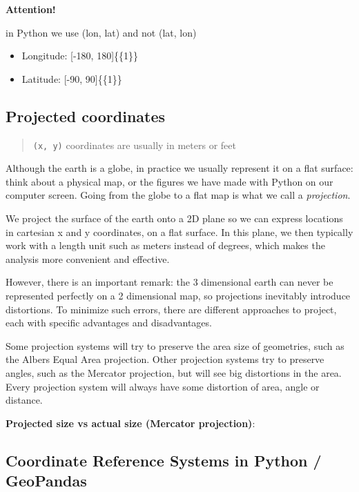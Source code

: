 \documentclass[
  letterpaper,
  DIV=11,
  numbers=noendperiod]{scrreprt}
\providecommand{\tightlist}{%
  \setlength{\itemsep}{0pt}\setlength{\parskip}{0pt}}\usepackage{longtable,booktabs,array}
\begin{document}
\textbf{Attention!}

in Python we use (lon, lat) and not (lat, lon)

\begin{itemize}
\tightlist
\item
  Longitude: {[}-180, 180{]}\{\{1\}\}
\item
  Latitude: {[}-90, 90{]}\{\{1\}\}
\end{itemize}

\subsection{Projected coordinates}\label{projected-coordinates}

\begin{quote}
\texttt{(x,\ y)} coordinates are usually in meters or feet
\end{quote}

Although the earth is a globe, in practice we usually represent it on a
flat surface: think about a physical map, or the figures we have made
with Python on our computer screen. Going from the globe to a flat map
is what we call a \emph{projection}.

We project the surface of the earth onto a 2D plane so we can express
locations in cartesian x and y coordinates, on a flat surface. In this
plane, we then typically work with a length unit such as meters instead
of degrees, which makes the analysis more convenient and effective.

However, there is an important remark: the 3 dimensional earth can never
be represented perfectly on a 2 dimensional map, so projections
inevitably introduce distortions. To minimize such errors, there are
different approaches to project, each with specific advantages and
disadvantages.

Some projection systems will try to preserve the area size of
geometries, such as the Albers Equal Area projection. Other projection
systems try to preserve angles, such as the Mercator projection, but
will see big distortions in the area. Every projection system will
always have some distortion of area, angle or distance.

\textbf{Projected size vs actual size (Mercator projection)}:

\subsection{Coordinate Reference Systems in Python /
GeoPandas}\label{coordinate-reference-systems-in-python-geopandas}
\end{document}
